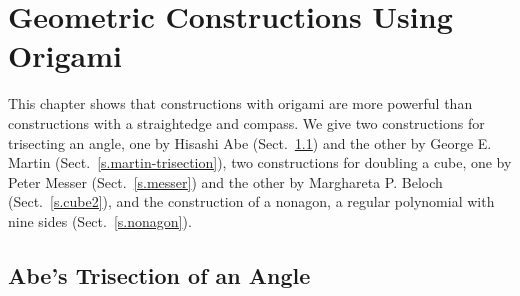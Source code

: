 

\chapter{Geometric Constructions Using Origami}\label{c.origami-constructions}




This chapter shows that constructions with origami are more powerful than constructions with a straightedge  and compass. We give two constructions for trisecting an angle, one by Hisashi Abe (Sect.~\ref{s.abe-trisection}) and the other by  George E. Martin (Sect.~\ref{s.martin-trisection}), two constructions for doubling a cube, one by Peter Messer (Sect.~\ref{s.messer}) and the other by Marghareta P. Beloch (Sect.~\ref{s.cube2}), and the construction of a nonagon, a regular polynomial with nine sides (Sect.~\ref{s.nonagon}).

\section{Abe's Trisection of an Angle}\label{s.abe-trisection}

